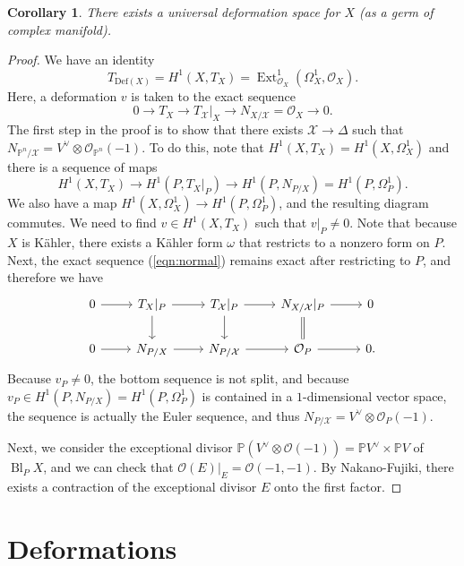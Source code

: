 \documentclass[leqno, openany]{memoir}
\newtheorem{cor}[thm]{Corollary}
\theoremstyle{definition}
\theoremstyle{remark}
\theoremstyle{plain}
\theoremstyle{definition}
\theoremstyle{remark}
\renewcommand{\P}{\mathbb{P}}
\newcommand{\mc}[1]{\mathcal{#1}}
\newcommand{\mr}[1]{\mathrm{#1}}
\DeclareMathOperator{\Ext}{Ext}
\DeclareMathOperator{\Bl}{Bl}
\begin{document}
\begin{cor}
    There exists a universal deformation space for $X$ (as a germ of complex manifold).
\end{cor}

\begin{proof}
    We have an identity
    \[ T_{\mr{Def}(X)} = H^1(X, T_X) = \Ext^1_{\mc{O}_X}(\Omega^1_X, \mc{O}_X). \]
    Here, a deformation $v$ is taken to the exact sequence
    \begin{equation}\label{eqn:normal} 0 \to T_X \to T_{\mc{X}}|_X \to N_{X/\mc{X}} = \mc{O}_X \to 0. \end{equation}
    The first step in the proof is to show that there exists $\mc{X} \to \Delta$ such that $N_{\P^n/\mc{X}} = V^{\vee} \otimes \mc{O}_{\P^n}(-1)$. To do this, note that $H^1(X, T_X) = H^1(X, \Omega^1_X)$ and there is a sequence of maps
    \[ H^1(X, T_X) \to H^1(P, T_X |_P) \to H^1(P, N_{P/X}) = H^1(P, \Omega^1_P). \]
    We also have a map $H^1(X, \Omega^1_X) \to H^1(P, \Omega^1_P)$, and the resulting diagram commutes. We need to find $v \in H^1(X, T_X)$ such that $v|_P \neq 0$. Note that because $X$ is K\"ahler, there exists a K\"ahler form $\omega$ that restricts to a nonzero form on $P$. Next, the exact sequence (\ref{eqn:normal}) remains exact after restricting to $P$, and therefore we have
    \begin{equation*}
    \begin{tikzcd}
        0 \ar{r} & T_X |_P \ar{r} \ar{d} & T_{\mc{X}}|_P \ar{r} \ar{d} & N_{X/\mc{X}} |_P \ar{r} \ar[equal]{d} & 0 \\
        0 \ar{r} & N_{P/X} \ar{r} & N_{P/\mc{X}} \ar{r} & \mc{O}_P \ar{r} & 0.
    \end{tikzcd}
    \end{equation*}
    Because $v_P \neq 0$, the bottom sequence is not split, and because $v_P \in H^1(P, N_{P/X}) = H^1(P, \Omega^1_P)$ is contained in a $1$-dimensional vector space, the sequence is actually the Euler sequence, and thus $N_{P/\mc{X}} = V^{\vee} \otimes \mc{O}_{P}(-1)$.

    Next, we consider the exceptional divisor $\P(V^{\vee} \otimes \mc{O}(-1)) = \P V^{\vee} \times \P V$ of $\Bl_P X$, and we can check that $\mc{O}(E) |_E = \mc{O}(-1, -1)$. By Nakano-Fujiki, there exists a contraction of the exceptional divisor $E$ onto the first factor.
\end{proof}

\section{Deformations}%
\label{sec:deformations}
\end{document}
